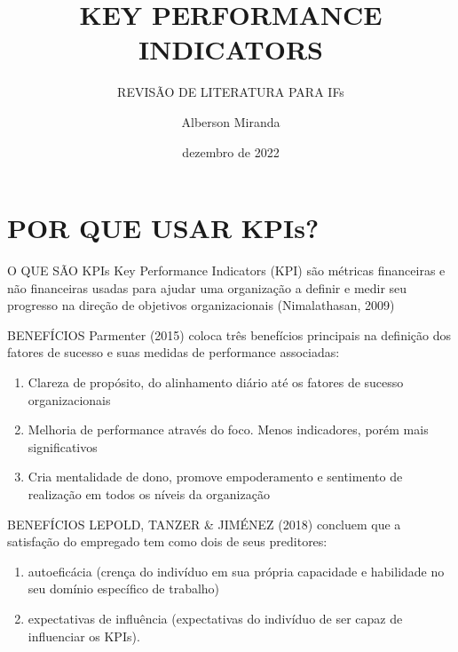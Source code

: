 \documentclass[
  ignorenonframetext,
]{beamer}
\title{KEY PERFORMANCE INDICATORS}
\subtitle{REVISÃO DE LITERATURA PARA IFs}
\author{Alberson Miranda}
\date{dezembro de 2022}
\providecommand{\tightlist}{%
  \setlength{\itemsep}{0pt}\setlength{\parskip}{0pt}}\usepackage{longtable,booktabs,array}
\begin{document}
\frame{\titlepage}
\ifdefined\Shaded\renewenvironment{Shaded}{\begin{tcolorbox}[breakable, borderline west={3pt}{0pt}{shadecolor}, boxrule=0pt, sharp corners, frame hidden, interior hidden, enhanced]}{\end{tcolorbox}}\fi

\hypertarget{por-que-usar-kpis}{%
\section{POR QUE USAR KPIs?}\label{por-que-usar-kpis}}

\begin{frame}{O QUE SÃO KPIs}
\protect\hypertarget{o-que-suxe3o-kpis}{}
Key Performance Indicators (KPI) são métricas financeiras e não
financeiras usadas para ajudar uma organização a definir e medir seu
progresso na direção de objetivos organizacionais (Nimalathasan, 2009)
\end{frame}

\begin{frame}{BENEFÍCIOS}
\protect\hypertarget{benefuxedcios}{}
Parmenter (2015) coloca três benefícios principais na definição dos
fatores de sucesso e suas medidas de performance associadas:

\begin{enumerate}
\tightlist
\item
  Clareza de propósito, do alinhamento diário até os fatores de sucesso
  organizacionais
\item
  Melhoria de performance através do foco. Menos indicadores, porém mais
  significativos
\item
  Cria mentalidade de dono, promove empoderamento e sentimento de
  realização em todos os níveis da organização
\end{enumerate}
\end{frame}

\begin{frame}{BENEFÍCIOS}
\protect\hypertarget{benefuxedcios-1}{}
LEPOLD, TANZER \& JIMÉNEZ (2018) concluem que a satisfação do empregado
tem como dois de seus preditores:

\begin{enumerate}
\tightlist
\item
  autoeficácia (crença do indivíduo em sua própria capacidade e
  habilidade no seu domínio específico de trabalho)
\item
  expectativas de influência (expectativas do indivíduo de ser capaz de
  influenciar os KPIs).
\end{enumerate}
\end{frame}
\end{document}

